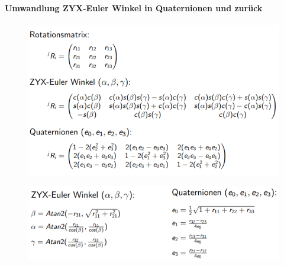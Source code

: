 \paragraph{Umwandlung ZYX-Euler Winkel in Quaternionen und zurück}
\begin{figure}[H]
	\begin{center}
		\includegraphics[scale=0.7]{resources/PNG/rotationsmatrizen-quaternionen.PNG}
		\caption{}
		\label{fig:resources/PNG/quaternionen-rotationsmatrizen.PNG}
	\end{center}
\end{figure}
\begin{figure}[H]
	\begin{center}
		\includegraphics[scale=0.7]{resources/PNG/zyx-euler-quaternionen.PNG}
		\caption{}
		\label{fig:resources/PNG/zyx-euler-quaternionen.PNG}
	\end{center}
\end{figure}
